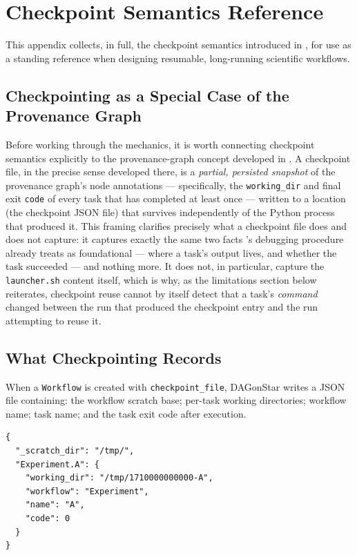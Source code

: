 \chapter{Checkpoint Semantics Reference}
\label{app:checkpoints}

This appendix collects, in full, the checkpoint semantics introduced in
, for use as a standing reference when designing
resumable, long-running scientific workflows.

\section{Checkpointing as a Special Case of the Provenance Graph}

Before working through the mechanics, it is worth connecting checkpoint
semantics explicitly to the provenance-graph concept developed in
. A checkpoint file, in the precise sense developed there,
is a \emph{partial, persisted snapshot} of the provenance graph's node
annotations --- specifically, the \texttt{working\_dir} and final exit
\texttt{code} of every task that has completed at least once --- written to
a location (the checkpoint JSON file) that survives independently of the
Python process that produced it. This framing clarifies precisely what a
checkpoint file does and does not capture: it captures exactly the same two
facts 's debugging procedure already treats as
foundational --- where a task's output lives, and whether the task
succeeded --- and nothing more. It does not, in particular, capture the
\texttt{launcher.sh} content itself, which is why, as the limitations
section below reiterates, checkpoint reuse cannot by itself detect that a
task's \emph{command} changed between the run that produced the checkpoint
entry and the run attempting to reuse it.

\section{What Checkpointing Records}

When a \texttt{Workflow} is created with \texttt{checkpoint\_file}, DAGonStar
writes a JSON file containing: the workflow scratch base; per-task working
directories; workflow name; task name; and the task exit code after
execution.

\begin{lstlisting}[caption={Representative checkpoint JSON shape.}]
{
  "_scratch_dir": "/tmp/",
  "Experiment.A": {
    "working_dir": "/tmp/1710000000000-A",
    "workflow": "Experiment",
    "name": "A",
    "code": 0
  }
}
\end{lstlisting}

